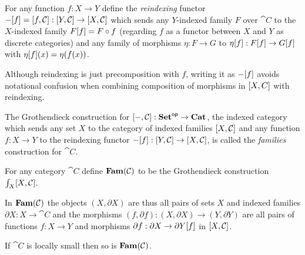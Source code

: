 %

\begin{definition}[Reindexing]
For any function $f: X \to Y$ define the \emph{reindexing} functor $-[f] = [f,\mathcal{C}]:
[Y,\mathcal{C}] \to [X,\mathcal{C}]$ which sends any $Y$-indexed family $F$ over $\cat{C}$ to the
$X$-indexed family $F[f] = F \circ f$ (regarding $f$ as a functor between $X$ and $Y$ as discrete
categories) and any family of morphisms $\eta: F \to G$ to $\eta[f]: F[f] \to
G[f]$ with $\eta[f](x) = \eta(f(x))$.
\end{definition}

\noindent Although reindexing is just precomposition with $f$, writing it as $-[f]$ avoids
notational confusion when combining composition of morphisms in $[X,C]$ with reindexing.

The Grothendieck construction for $[-,\mathcal{C}]: \mathbf{Set}^{\mathsf{op}} \to \mathbf{Cat}$, the indexed category which sends
any set $X$ to the category of indexed families $[X,\mathcal{C}]$ and any function $f: X \to Y$ to the
reindexing functor $-[f]: [Y,\mathcal{C}] \to [X,\mathcal{C}]$, is called the \emph{families}
construction for $\cat{C}$.

\begin{definition}
\label{def:Fam}
For any category $\cat{C}$ define $\mathbf{Fam}(\mathcal{C})$ to be the Grothendieck construction
$\int_{X}[X,\mathcal{C}]$.
\end{definition}

\noindent In $\mathbf{Fam}(\mathcal{C})$ the objects $(X, \partial X)$ are thus all pairs of sets $X$ and indexed families
$\partial X: X \to \cat{C}$ and the morphisms $(f, \partial f): (X, \partial X) \to (Y, \partial Y)$ are all
pairs of functions $f: X \to Y$ and morphisms $\partial f: \partial X \to \partial Y[f]$ in
$[X,\mathcal{C}]$.

\begin{proposition}
\label{prop:Grothendieck:fam-inherits-local-smallness}
If $\cat{C}$ is locally small then so is $\mathbf{Fam}(\mathcal{C})$.
\end{proposition}

